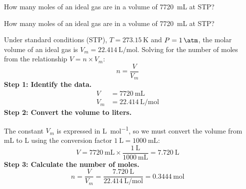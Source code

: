 \begin{exercise}
    How many moles of an ideal gas are in a volume of \qty{7720}{\mL} at STP?
    \begin{solu}
        How many moles of an ideal gas are in a volume of \qty{7720}{\mL} at STP?

        Under standard conditions (STP), $T = \qty{273.15}{\kelvin}$ and $P = \qty{1}{\atm}$,
        the molar volume of an ideal gas is $V_m = \qty{22.414}{\liter\per\mol}$. Solving
        for the number of moles from the relationship $V = n \times V_m$:
        \begin{equation*}
            n = \frac{V}{V_m}
        \end{equation*}
        \textbf{Step 1: Identify the data.}
        \begin{align*}
            V   &= \qty{7720}{\mL} \\
            V_m &= \qty{22.414}{\liter\per\mol}
        \end{align*}
        \textbf{Step 2: Convert the volume to liters.}

        The constant $V_m$ is expressed in \unit{\liter\per\mol}, so we must convert
        the volume from mL to L using the conversion factor
        $\qty{1}{\liter} = \qty{1000}{\mL}$:
        \begin{equation*}
            V = \qty{7720}{\mL} \times \frac{\qty{1}{\liter}}{\qty{1000}{\mL}}
            = \qty{7.720}{\liter}
        \end{equation*}
        \textbf{Step 3: Calculate the number of moles.}
        \begin{equation*}
            n = \frac{V}{V_m} = \frac{\qty{7.720}{\liter}}{\qty{22.414}{\liter\per\mol}}
            = \boxed{\qty{0.3444}{\mol}}
        \end{equation*}
    \end{solu}
\end{exercise}
